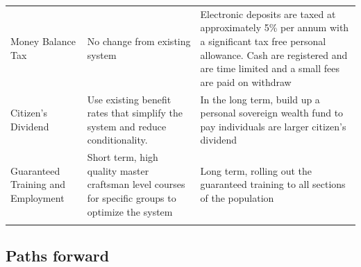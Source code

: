 \documentclass[]{tufte-handout}
\begin{document}
\begin{longtable}[]{@{}lll@{}}
\begin{minipage}[t]{0.20\columnwidth}
Money Balance Tax\strut
\end{minipage} & \begin{minipage}[t]{0.36\columnwidth}\raggedright
No change from existing system\strut
\end{minipage} & \begin{minipage}[t]{0.36\columnwidth}\raggedright
Electronic deposits are taxed at approximately 5\% per annum with a
significant tax free personal allowance. Cash are registered and are
time limited and a small fees are paid on withdraw\strut
\end{minipage}\tabularnewline
\begin{minipage}[t]{0.20\columnwidth}\raggedright
Citizen's Dividend\strut
\end{minipage} & \begin{minipage}[t]{0.36\columnwidth}\raggedright
Use existing benefit rates that simplify the system and reduce
conditionality.\strut
\end{minipage} & \begin{minipage}[t]{0.36\columnwidth}\raggedright
In the long term, build up a personal sovereign wealth fund to pay
individuals are larger citizen's dividend\strut
\end{minipage}\tabularnewline
\begin{minipage}[t]{0.20\columnwidth}\raggedright
Guaranteed Training and Employment\strut
\end{minipage} & \begin{minipage}[t]{0.36\columnwidth}\raggedright
Short term, high quality master craftsman level courses for specific
groups to optimize the system\strut
\end{minipage} & \begin{minipage}[t]{0.36\columnwidth}\raggedright
Long term, rolling out the guaranteed training to all sections of the
population\strut
\end{minipage}\tabularnewline
\begin{minipage}[t]{0.20\columnwidth}\raggedright
\strut
\end{minipage} & \begin{minipage}[t]{0.36\columnwidth}\raggedright
\strut
\end{minipage} & \begin{minipage}[t]{0.36\columnwidth}\raggedright
\strut
\end{minipage}\tabularnewline
\bottomrule
\end{longtable}

\hypertarget{paths-forward}{%
\subsection{Paths forward}\label{paths-forward}}
\end{document}
